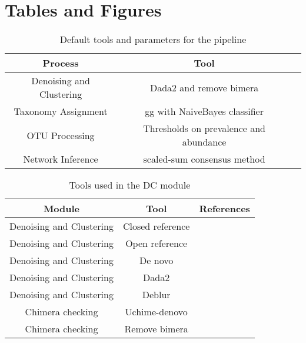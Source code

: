 
\newpage
\section*{Tables and Figures}


  \begin{table}[h]
    \centering
    \small
    \begin{tabular}{|c|c|c|}
      \hline
      \textbf{Process} & \textbf{Tool} \\
      \hline
      Denoising and Clustering & Dada2 and remove bimera \\
      Taxonomy Assignment & \ac{gg} with NaiveBayes classifier \\
      OTU Processing & Thresholds on prevalence and abundance \\
      Network Inference & scaled-sum consensus method \\
      \hline
    \end{tabular}
    \caption{Default tools and parameters for the pipeline}
    \label{tab:default_options}
  \end{table}

  \begin{table}[h]
    \centering
    \small
    \begin{tabular}{|c|c|c|}
      \hline
      \textbf{Module} & \textbf{Tool} & \textbf{References} \\
      \hline
      Denoising and Clustering & Closed reference & \cite{rognesVSEARCHVersatileOpen2016,bolyenReproducibleInteractiveScalable2019} \\
      Denoising and Clustering & Open reference & \cite{rognesVSEARCHVersatileOpen2016,bolyenReproducibleInteractiveScalable2019} \\
      Denoising and Clustering & De novo & \cite{rognesVSEARCHVersatileOpen2016,bolyenReproducibleInteractiveScalable2019} \\
      Denoising and Clustering & Dada2 & \cite{Callahan2016} \\
      Denoising and Clustering & Deblur & \cite{Amir2017,bolyenReproducibleInteractiveScalable2019} \\
      \hline
      Chimera checking & Uchime-denovo & \cite{rognesVSEARCHVersatileOpen2016,bolyenReproducibleInteractiveScalable2019} \\
      Chimera checking & Remove bimera & \cite{Callahan2016} \\
      \hline
    \end{tabular}
    \caption{Tools used in the DC module}
    \label{tab:dc_tools}
  \end{table}

